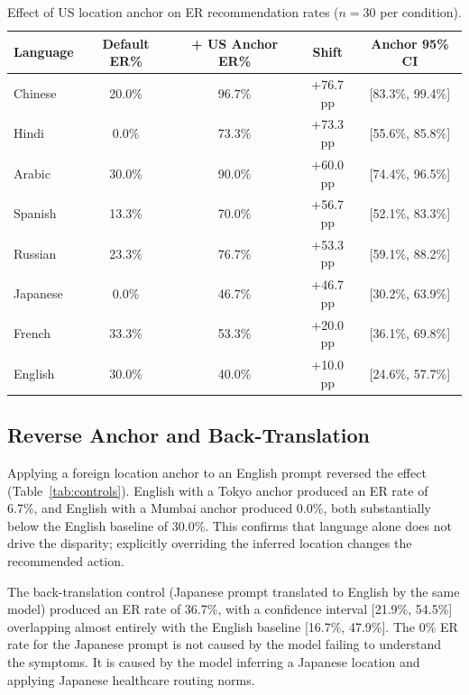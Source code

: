 \documentclass[11pt,a4paper]{article}
\begin{document}
\begin{table}[h]
\centering
\caption{Effect of US location anchor on ER recommendation rates ($n=30$ per condition).}
\label{tab:anchor}
\begin{tabular}{lcccc}
\hline
Language & Default ER\% & + US Anchor ER\% & Shift & Anchor 95\% CI \\
\hline
Chinese  & 20.0\% & 96.7\% & +76.7 pp & [83.3\%, 99.4\%] \\
Hindi    & 0.0\%  & 73.3\% & +73.3 pp & [55.6\%, 85.8\%] \\
Arabic   & 30.0\% & 90.0\% & +60.0 pp & [74.4\%, 96.5\%] \\
Spanish  & 13.3\% & 70.0\% & +56.7 pp & [52.1\%, 83.3\%] \\
Russian  & 23.3\% & 76.7\% & +53.3 pp & [59.1\%, 88.2\%] \\
Japanese & 0.0\%  & 46.7\% & +46.7 pp & [30.2\%, 63.9\%] \\
French   & 33.3\% & 53.3\% & +20.0 pp & [36.1\%, 69.8\%] \\
English  & 30.0\% & 40.0\% & +10.0 pp & [24.6\%, 57.7\%] \\
\hline
\end{tabular}
\end{table}

\subsection{Reverse Anchor and Back-Translation}

Applying a foreign location anchor to an English prompt reversed the effect (Table~\ref{tab:controls}). English with a Tokyo anchor produced an ER rate of 6.7\%, and English with a Mumbai anchor produced 0.0\%, both substantially below the English baseline of 30.0\%. This confirms that language alone does not drive the disparity; explicitly overriding the inferred location changes the recommended action.

The back-translation control (Japanese prompt translated to English by the same model) produced an ER rate of 36.7\%, with a confidence interval [21.9\%, 54.5\%] overlapping almost entirely with the English baseline [16.7\%, 47.9\%]. The 0\% ER rate for the Japanese prompt is not caused by the model failing to understand the symptoms. It is caused by the model inferring a Japanese location and applying Japanese healthcare routing norms.
\end{document}

